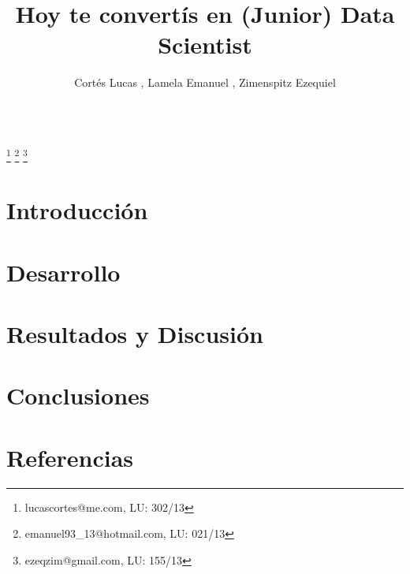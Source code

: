 \documentclass{endm}
\begin{document}
\begin{verbatim}\end{verbatim}\vspace{2.5cm}

\begin{frontmatter}

\title{Hoy te convert\'is en (Junior) Data Scientist}

\author{Cort\'es Lucas , Lamela Emanuel , Zimenspitz Ezequiel }
\address{Universidad de Buenos Aires\\ Buenos Aires, Argentina}

\thanks[lucasemail]{lucascortes@me.com, LU: 302/13}
\thanks[emanuelemail]{emanuel93\_13@hotmail.com, LU: 021/13}
\thanks[ezequielemail]{ezeqzim@gmail.com, LU: 155/13}

\begin{abstract}
\end{abstract}

\begin{keyword}
\end{keyword}

\end{frontmatter}

\section{Introducci\'on}\label{intro}

\section{Desarrollo}

\section{Resultados y Discusi\'on}

\section{Conclusiones}

\section{Referencias}



\end{document}

